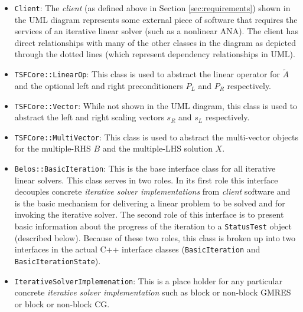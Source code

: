 \documentclass[pdf,ps2pdf,11pt]{SANDreport}
\begin{document}
\begin{itemize}

\item{}\texttt{Client}:
The {}\textit{client} (as defined above in Section
{}\ref{sec:requirements}) shown in the UML diagram represents some
external piece of software that requires the services of an iterative
linear solver (such as a nonlinear ANA).  The client has direct
relationships with many of the other classes in the diagram as
depicted through the dotted lines (which represent dependency
relationships in UML).

\item{}\texttt{TSFCore::LinearOp}:
This class is used to abstract the linear operator for $\tilde{A}$ and
the optional left and right preconditioners $P_L$ and $P_R$
respectively.

\item{}\texttt{TSFCore::Vector}:
While not shown in the UML diagram, this class is used to abstract the
left and right scaling vectors $s_R$ and $s_L$ respectively.

\item{}\texttt{TSFCore::MultiVector}:
This class is used to abstract the multi-vector objects for the
multiple-RHS $B$ and the multiple-LHS solution $X$.

\item{}\texttt{Belos::BasicIteration}:
This is the base interface class for all iterative linear solvers.
This class serves in two roles.  In its first role this interface
decouples concrete {}\textit{iterative solver implementations} from
{}\textit{client} software and is the basic mechanism for delivering a
linear problem to be solved and for invoking the iterative solver.
The second role of this interface is to present basic information
about the progress of the iteration to a {}\texttt{Status\-Test}
object (described below).  Because of these two roles, this class is
broken up into two interfaces in the actual C++ interface classes
({}\texttt{Basic\-Iteration} and {}\texttt{Basic\-Iteration\-State}).

\item{}\texttt{IterativeSolverImplemenation}:
This is a place holder for any particular concrete {}\textit{iterative
solver implementation} such as block or non-block GMRES or block or
non-block CG.


\end{itemize}
\end{document}
